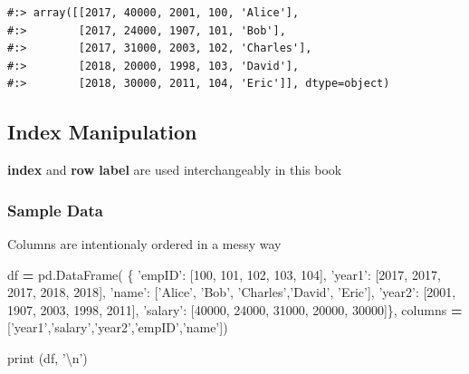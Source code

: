\documentclass[
]{book}
\newenvironment{Shaded}{\begin{snugshade}}{\end{snugshade}}
\newcommand{\BuiltInTok}[1]{#1}
\newcommand{\CharTok}[1]{\textcolor[rgb]{0.5,0.5,0.5}{#1}}
\newcommand{\DecValTok}[1]{\textcolor[rgb]{0.06,0.06,0.06}{#1}}
\newcommand{\NormalTok}[1]{#1}
\newcommand{\OperatorTok}[1]{\textcolor[rgb]{0.43,0.43,0.43}{\textbf{#1}}}
\newcommand{\StringTok}[1]{\textcolor[rgb]{0.5,0.5,0.5}{#1}}
\begin{document}
\begin{verbatim}
#:> array([[2017, 40000, 2001, 100, 'Alice'],
#:>        [2017, 24000, 1907, 101, 'Bob'],
#:>        [2017, 31000, 2003, 102, 'Charles'],
#:>        [2018, 20000, 1998, 103, 'David'],
#:>        [2018, 30000, 2011, 104, 'Eric']], dtype=object)
\end{verbatim}

\hypertarget{index-manipulation-1}{%
\subsection{Index Manipulation}\label{index-manipulation-1}}

\textbf{index} and \textbf{row label} are used interchangeably in this book

\hypertarget{sample-data-6}{%
\subsubsection{Sample Data}\label{sample-data-6}}

Columns are intentionaly ordered in a messy way

\begin{Shaded}
\begin{Highlighting}[]
\NormalTok{df }\OperatorTok{=}\NormalTok{ pd.DataFrame(}
\NormalTok{    \{ }\StringTok{'empID'}\NormalTok{:  [}\DecValTok{100}\NormalTok{,      }\DecValTok{101}\NormalTok{,    }\DecValTok{102}\NormalTok{,      }\DecValTok{103}\NormalTok{,     }\DecValTok{104}\NormalTok{],}
      \StringTok{'year1'}\NormalTok{:   [}\DecValTok{2017}\NormalTok{,     }\DecValTok{2017}\NormalTok{,   }\DecValTok{2017}\NormalTok{,      }\DecValTok{2018}\NormalTok{,    }\DecValTok{2018}\NormalTok{],}
      \StringTok{'name'}\NormalTok{:   [}\StringTok{'Alice'}\NormalTok{,  }\StringTok{'Bob'}\NormalTok{,  }\StringTok{'Charles'}\NormalTok{,}\StringTok{'David'}\NormalTok{, }\StringTok{'Eric'}\NormalTok{],}
      \StringTok{'year2'}\NormalTok{:   [}\DecValTok{2001}\NormalTok{,     }\DecValTok{1907}\NormalTok{,   }\DecValTok{2003}\NormalTok{,      }\DecValTok{1998}\NormalTok{,    }\DecValTok{2011}\NormalTok{],}
      \StringTok{'salary'}\NormalTok{: [}\DecValTok{40000}\NormalTok{,    }\DecValTok{24000}\NormalTok{,  }\DecValTok{31000}\NormalTok{,     }\DecValTok{20000}\NormalTok{,   }\DecValTok{30000}\NormalTok{]\},}
\NormalTok{    columns }\OperatorTok{=}\NormalTok{ [}\StringTok{'year1'}\NormalTok{,}\StringTok{'salary'}\NormalTok{,}\StringTok{'year2'}\NormalTok{,}\StringTok{'empID'}\NormalTok{,}\StringTok{'name'}\NormalTok{])}

\BuiltInTok{print}\NormalTok{ (df, }\StringTok{'}\CharTok{\textbackslash{}n}\StringTok{'}\NormalTok{)}
\end{Highlighting}
\end{Shaded}
\end{document}
